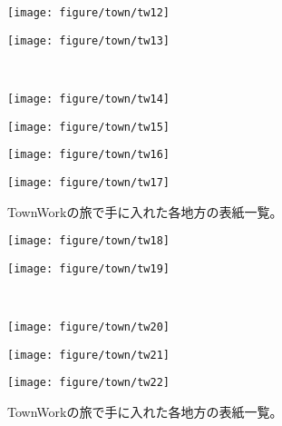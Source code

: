 \documentclass[12pt]{jsarticle}
\begin{document}
\newpage
\begin{figure}[htbp]
\vspace{-10mm}
    \centering
  \begin{minipage}{0.4\linewidth}
    \centering
    \texttt{[image: figure/town/tw12]}
  \end{minipage}
  \begin{minipage}{0.4\linewidth}
    \centering
    \texttt{[image: figure/town/tw13]}
  \end{minipage}\\
  \begin{minipage}{0.4\linewidth}
    \centering
    \texttt{[image: figure/town/tw14]}
  \end{minipage}
  \begin{minipage}{0.4\linewidth}
    \centering
    \texttt{[image: figure/town/tw15]}
  \end{minipage}
  \begin{minipage}{0.4\linewidth}
    \centering
    \texttt{[image: figure/town/tw16]}
  \end{minipage}
  \begin{minipage}{0.4\linewidth}
    \centering
    \texttt{[image: figure/town/tw17]}
  \end{minipage}
  \caption{TownWorkの旅で手に入れた各地方の表紙一覧。}
  \label{CscDetaDphi-CSide}
\end{figure}

\newpage
\begin{figure}[htbp]
\vspace{-10mm}
    \centering
  \begin{minipage}{0.4\linewidth}
    \centering
    \texttt{[image: figure/town/tw18]}
  \end{minipage}
  \begin{minipage}{0.4\linewidth}
    \centering
    \texttt{[image: figure/town/tw19]}
  \end{minipage}\\
  \begin{minipage}{0.4\linewidth}
    \centering
    \texttt{[image: figure/town/tw20]}
  \end{minipage}
  \begin{minipage}{0.4\linewidth}
    \centering
    \texttt{[image: figure/town/tw21]}
  \end{minipage}
  \begin{minipage}{0.4\linewidth}
    \centering
    \texttt{[image: figure/town/tw22]}
  \end{minipage}
  \caption{TownWorkの旅で手に入れた各地方の表紙一覧。}
  \label{CscDetaDphi-CSide}
\end{figure}
\end{document}
